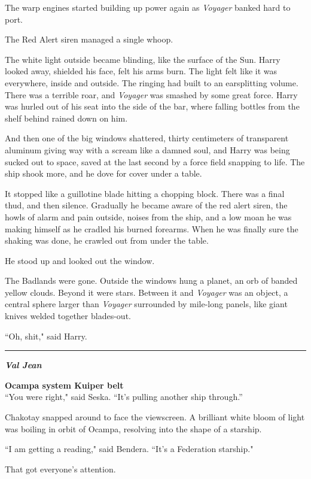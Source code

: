 \documentclass[twoside,letterpaper,12pt]{memoir}
\begin{document}
The warp engines started building up power again as \textit{Voyager }banked hard to port.

The Red Alert siren managed a single whoop.

The white light outside became blinding, like the surface of the Sun. Harry looked away, shielded his face, felt his arms burn. The light felt like it was everywhere, inside and outside. The ringing had built to an earsplitting volume. There was a terrible roar, and \textit{Voyager} was smashed by some great force. Harry was hurled out of his seat into the side of the bar, where falling bottles from the shelf behind rained down on him.

And then one of the big windows shattered, thirty centimeters of transparent aluminum giving way with a scream like a damned soul, and Harry was being sucked out to space, saved at the last second by a force field snapping to life. The ship shook more, and he dove for cover under a table.

It stopped like a guillotine blade hitting a chopping block. There was a final thud, and then silence. Gradually he became aware of the red alert siren, the howls of alarm and pain outside, noises from the ship, and a low moan he was making himself as he cradled his burned forearms. When he was finally sure the shaking was done, he crawled out from under the table.

He stood up and looked out the window.

The Badlands were gone. Outside the windows hung a planet, an orb of banded yellow clouds. Beyond it were stars. Between it and \textit{Voyager} was an object, a central sphere larger than \textit{Voyager} surrounded by mile-long panels, like giant knives welded together blades-out.

``Oh, shit," said Harry.

\fancybreak{\rule{3cm}{0.4 pt}}
\noindent\textit{\textbf{Val Jean}}

\noindent\textbf{Ocampa system Kuiper belt}\\

``You were right," said Seska. ``It’s pulling another ship through.''

Chakotay snapped around to face the viewscreen. A brilliant white bloom of light was boiling in orbit of Ocampa, resolving into the shape of a starship.

``I am getting a reading," said Bendera. ``It's a Federation starship."

That got everyone's attention.
\end{document}
